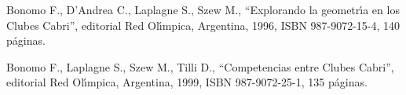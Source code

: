
\item   Bonomo F., D'Andrea C., Laplagne S., Szew M., ``Explorando
la geometr\'{\i}a en los Clubes Cabri'', editorial Red
Ol\'{\i}mpica, Argentina, 1996, ISBN 987-9072-15-4, 140 p\'aginas.

\item   Bonomo F., Laplagne S., Szew M., Tilli D., ``Competencias
entre Clubes Cabri'', editorial Red Ol\'{\i}mpica, Argentina,
1999, ISBN 987-9072-25-1, 135 p\'aginas.
